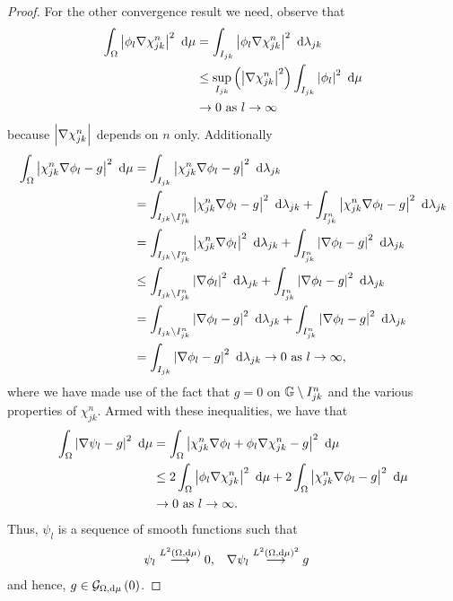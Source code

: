 \begin{proof}
	For the other convergence result we need, observe that
	\begin{align*}
		\int_{\Omega}\left\lvert \phi_l\nabla\chi_{jk}^{n} \right\rvert^2 \ \mathrm{d}\mu &= \int_{I_{jk}}\left\lvert \phi_l\nabla\chi_{jk}^{n} \right\rvert^2 \ \mathrm{d}\lambda_{jk} \\
		&\leq \sup_{I_{jk}}\left( \left\lvert \nabla\chi_{jk}^{n} \right\rvert^{2} \right)\int_{I_{jk}}\left\lvert \phi_l \right\rvert^2 \ \mathrm{d}\mu \\
		&\rightarrow 0 \ \text{as} \ l \rightarrow\infty
	\end{align*}
	because $\left\lvert \nabla\chi_{jk}^{n} \right\rvert$ depends on $n$ only.
	Additionally
	\begin{align*}
		\int_{\Omega}\left\lvert \chi_{jk}^n\nabla\phi_l - g \right\rvert^2 \ \mathrm{d}\mu &= \int_{I_{jk}}\left\lvert \chi_{jk}^n\nabla\phi_l - g \right\rvert^2 \ \mathrm{d}\lambda_{jk} \\
		&= \int_{I_{jk}\setminus I_{jk}^n}\left\lvert \chi_{jk}^n\nabla\phi_l - g \right\rvert^2 \ \mathrm{d}\lambda_{jk} + \int_{I_{jk}^n}\left\lvert \chi_{jk}^n\nabla\phi_l - g \right\rvert^2 \ \mathrm{d}\lambda_{jk} \\
		&= \int_{I_{jk}\setminus I_{jk}^n}\left\lvert \chi_{jk}^n\nabla\phi_l \right\rvert^2 \ \mathrm{d}\lambda_{jk} +  \int_{I_{jk}^n}\left\lvert \nabla\phi_l - g \right\rvert^2 \ \mathrm{d}\lambda_{jk} \\
		&\leq \int_{I_{jk}\setminus I_{jk}^n}\left\lvert \nabla\phi_l \right\rvert^2 \ \mathrm{d}\lambda_{jk} +  \int_{I_{jk}^n}\left\lvert \nabla\phi_l - g \right\rvert^2 \ \mathrm{d}\lambda_{jk} \\
		&= \int_{I_{jk}\setminus I_{jk}^n}\left\lvert \nabla\phi_l - g \right\rvert^2 \ \mathrm{d}\lambda_{jk} +  \int_{I_{jk}^n}\left\lvert \nabla\phi_l - g \right\rvert^2 \ \mathrm{d}\lambda_{jk} \\
		&= \int_{I_{jk}}\left\lvert \nabla\phi_l - g \right\rvert^2 \ \mathrm{d}\lambda_{jk} \rightarrow0 \ \text{as} \ l \rightarrow\infty,
	\end{align*}
	where we have made use of the fact that $g=0$ on $\mathbb{G}\setminus I_{jk}^n$ and the various properties of $\chi_{jk}^n$.
	Armed with these inequalities, we have that
	\begin{align*}
		\int_{\Omega}\left\lvert \nabla\psi_l - g \right\rvert^2 \ \mathrm{d}\mu 
		&= \int_{\Omega}\left\lvert \chi_{jk}^n\nabla\phi_l + \phi_l\nabla\chi_{jk}^n - g \right\rvert^2 \ \mathrm{d}\mu \\
		&\leq 2\int_{\Omega}\left\lvert \phi_l\nabla\chi_{jk}^n \right\rvert^2 \ \mathrm{d}\mu + 2\int_{\Omega}\left\lvert \chi_{jk}^n\nabla\phi_l - g \right\rvert^2 \ \mathrm{d}\mu \\
		&\rightarrow0 \ \text{as} \ l \rightarrow\infty.
	\end{align*}
	Thus, $\psi_l$ is a sequence of smooth functions such that
	\begin{align*}
		\psi_l \overset{L^{2}\left( \Omega,\mathrm{d}\mu \right)}{\longrightarrow} 0, &\quad
		\nabla\psi_l \overset{L^{2}\left( \Omega,\mathrm{d}\mu \right)^2}{\longrightarrow} g
	\end{align*}
	and hence, $g\in\mathcal{G}_{ \Omega, \mathrm{d}\mu}\left( 0 \right)$.
\end{proof}

